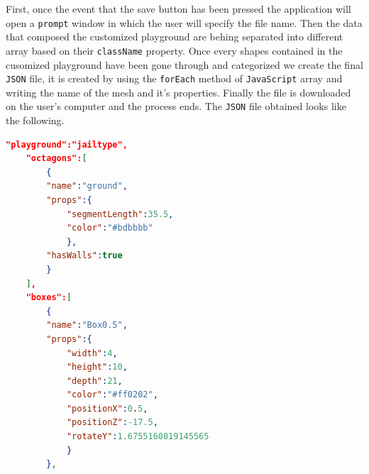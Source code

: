 \documentclass{scrbook}
\begin{document}
First, once the event that the save button has been pressed the application will open a \texttt{prompt} window in which the user will specify the file name. Then the data that composed the customized playground are behing separated into different array based on their \texttt{className} property. 
Once every shapes contained in the cusomized playground have been gone through and categorized we create the final \texttt{JSON} file, it is created by using the \texttt{forEach} method of \texttt{JavaScript} array and writing the name of the mesh and it's properties. 
Finally the file is downloaded on the user's computer and the process ends. The \texttt{JSON} file obtained looks like the following.
\begin{lstlisting}[language=json, basicstyle=\ttfamily\small]
  "playground":"jailtype",
    "octagons":[
        {
        "name":"ground",
        "props":{
            "segmentLength":35.5,
            "color":"#bdbbbb"
            },
        "hasWalls":true
        }
    ],
    "boxes":[
        {
        "name":"Box0.5",
        "props":{
            "width":4,
            "height":10,
            "depth":21,
            "color":"#ff0202",
            "positionX":0.5,
            "positionZ":-17.5,
            "rotateY":1.6755160819145565
            }
        },
\end{lstlisting}
\end{document}
